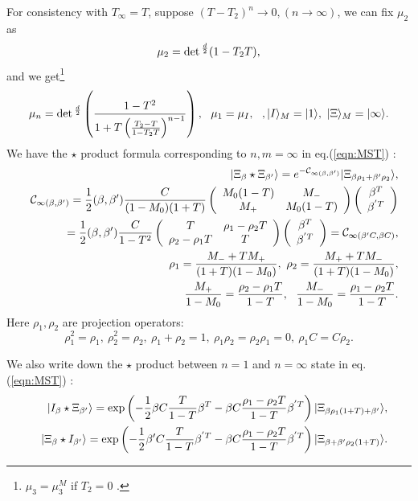 \documentclass[12pt,a4paper]{article}
\begin{document}
For consistency with $T_\infty=T$, suppose $(T-T_2)^n\rightarrow0, (n\rightarrow\infty)$, we can fix $\mu_2$ as
\begin{equation}
\mu_2=\det{}^{d\over2}(1-T_2T),
\end{equation}
and we get\footnote{
	$\mu_3=\mu_3^M$ if $T_2=0$ \cite{FO}.
}
\begin{equation}
\mu_n=\det{}^{d\over2}\left({1-T^2\over1+T\left({T_2-T\over1-T_2T}\right)^{n-1}}\right),\ \ \mu_1=\mu_I,\ \ ,|I\rangle_M=|1\rangle,\ |\Xi\rangle_M=|\infty\rangle.
\end{equation}
We have  the $\star$ product formula corresponding to $n,m=\infty$ in eq.(\ref{eqn:MST}) :
\begin{eqnarray}
&&|\Xi_\beta\star\Xi_{\beta'}\rangle=e^{-{\cal C}_{\infty(\beta,\beta')}}|\Xi_{\beta\rho_1+\beta'\rho_2}\rangle,\nonumber \\
&&{\cal C}_{\infty(\beta,\beta')}={1\over2}(\beta,\beta'){C\over(1-M_0)(1+T)}
\left(
\begin{array}{cc}
M_0(1-T)  & M_-  \\
M_+     & M_0(1-T)
\end{array}
\right)
\left(
\begin{array}{c}
\beta ^T    \\
\beta^{'T}     
\end{array}
\right)\nonumber \\
&&={1\over2}(\beta,\beta'){C\over1-T^2}
\left(
\begin{array}{cc}
T  & \rho_1-\rho_2T  \\
\rho_2-\rho_1T     & T
\end{array}
\right)
\left(
\begin{array}{c}
\beta ^T    \\
\beta^{'T}     
\end{array}
\right)={\cal C}_{\infty(\beta'C,\beta C)},\nonumber \\
&&\rho_1={M_-+TM_+\over(1+T)(1-M_0)}, \ \rho_2={M_++TM_-\over(1+T)(1-M_0)},\nonumber \\ 
&&{M_+\over1-M_0}={\rho_2-\rho_1T\over1-T},\ \ {M_-\over1-M_0}={\rho_1-\rho_2T\over1-T}.
\end{eqnarray}
Here $\rho_1,\rho_2$ are projection operators:
\begin{equation}
\rho_1^2=\rho_1,\ \rho_2^2=\rho_2,\ \rho_1+\rho_2=1,\ \rho_1\rho_2=\rho_2\rho_1=0,\ \rho_1C=C\rho_2.
\end{equation}

We also write down the $\star$ product between $n=1$ and $n=\infty$ state in eq.(\ref{eqn:MST}) :
\begin{eqnarray}
&&|I_\beta\star\Xi_{\beta'}\rangle=\exp\left(-{1\over2}\beta C{T\over1-T}\beta^T-\beta C{\rho_1-\rho_2T\over1-T}\beta^{'T}\right)|\Xi_{\beta\rho_1(1+T)+\beta'}\rangle,\nonumber \\
&&|\Xi_\beta\star I_{\beta'}\rangle=\exp\left(-{1\over2}\beta'C{T\over1-T}\beta^{'T}-\beta C{\rho_1-\rho_2T\over1-T}\beta^{'T}\right)|\Xi_{\beta+\beta'\rho_2(1+T)}\rangle.
\end{eqnarray}
\end{document}

